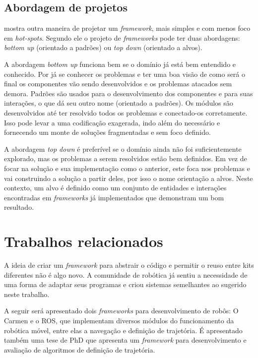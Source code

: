 \subsection{Abordagem de projetos}

\cite{Szyperski2002} mostra outra maneira de projetar um \textit{framework}, mais simples e com menos foco em \textit{hot-spots}. Segundo ele o projeto de \textit{frameworks} pode ter duas abordagens: \textit{bottom up} (orientado a padrões) ou \textit{top down} (orientado a alvos).

A abordagem \textit{bottom up} funciona bem se o domínio já está bem entendido e conhecido. Por já se conhecer os problemas e ter uma boa visão de como será o final os componentes vão sendo desenvolvidos e os problemas atacados sem demora. Padrões são usados para o desenvolvimento dos componentes e para suas interações, o que dá seu outro nome (orientado a padrões). Os módulos são desenvolvidos até ter resolvido todos os problemas e conectado-os corretamente. Isso pode levar a uma codificação exagerada, indo além do necessário e fornecendo um monte de soluções fragmentadas e sem foco definido.

A abordagem \textit{top down} é preferível se o domínio ainda não foi suficientemente explorado, mas os problemas a serem resolvidos estão bem definidos. Em vez de focar na solução e sua implementação como o anterior, este foca nos problemas e vai construindo a solução a partir deles, por isso o nome orientação a alvos. Neste contexto, um alvo é definido como um conjunto de entidades e interações encontradas em \textit{frameworks} já implementados que demonstram um bom resultado.

\section{Trabalhos relacionados}

A ideia de criar um \textit{framework} para abstrair o código e permitir o reuso entre kits diferentes não é algo novo. A comunidade de robótica já sentiu a necessidade de uma forma de adaptar seus programas e criou sistemas semelhantes ao sugerido neste trabalho.

A seguir será apresentado dois \textit{frameworks} para desenvolvimento de robôs: O Carmen e o ROS, que implementam diversos módulos do funcionamento da robótica móvel, entre elas a navegação e definição de trajetória. É apresentado também uma tese de PhD que apresenta um \textit{framework} para desenvolvimento e avaliação de algoritmos de definição de trajetória.


